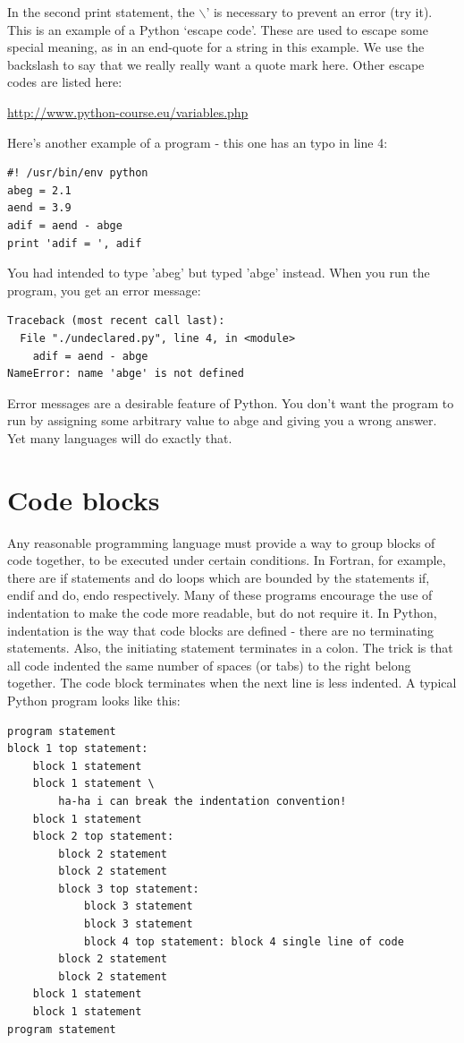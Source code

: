 \documentclass[11pt]{book}
\begin{document}
{{{\noindent
In the second print statement, the $\backslash$' is necessary to prevent an error (try it).   This is an example of a Python `escape code'.   These are used to escape some special meaning, as in an end-quote for a string in this example. We use the backslash to say that we really really want a quote mark here.   Other escape codes are listed here:  

\url{http://www.python-course.eu/variables.php}

Here's another example of a program - this one has an typo in line 4:

{ \color{blue} \begin{verbatim}
#! /usr/bin/env python
abeg = 2.1
aend = 3.9
adif = aend - abge
print 'adif = ', adif
\end{verbatim}}

\noindent
You had intended to type 'abeg' but typed 'abge' instead.  When
you run the program, you get an error message:

{ \color{blue} \begin{verbatim}
Traceback (most recent call last):
  File "./undeclared.py", line 4, in <module>
    adif = aend - abge
NameError: name 'abge' is not defined
\end{verbatim}}

\noindent
Error messages are a desirable feature of Python.  You don't want the program
to run by assigning some arbitrary value to abge and giving you
a wrong answer.  Yet many languages will do exactly that.


\section{Code blocks}
Any reasonable programming language must provide a way to group blocks of code together, to be executed under certain conditions.  In Fortran, for example, there are if statements and do loops which are bounded by the statements if, endif and do, endo respectively.  Many of these programs encourage the use of indentation to make the code more readable, but do not require it.  In Python, indentation is the way that code blocks are defined - there are no terminating statements. Also, the initiating statement terminates in a colon.  The trick is that all code indented the same number of spaces (or tabs) to the right belong together.  The code block terminates when the next line is less indented.     A typical Python program looks like this: 

{ \color{blue}\begin {verbatim}
program statement
block 1 top statement:
    block 1 statement
    block 1 statement \
        ha-ha i can break the indentation convention!
    block 1 statement
    block 2 top statement:
        block 2 statement
        block 2 statement
        block 3 top statement:
            block 3 statement
            block 3 statement
            block 4 top statement: block 4 single line of code
        block 2 statement
        block 2 statement
    block 1 statement
    block 1 statement
program statement
\end{verbatim}}


}}}
\end{document}
